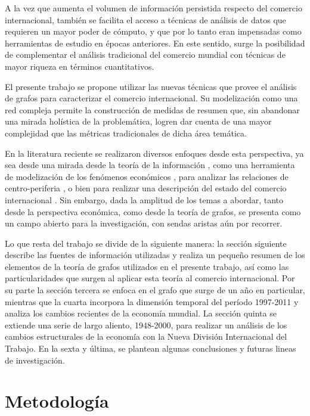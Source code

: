 \documentclass[a4paper]{article}
\begin{document}
A la vez que aumenta el volumen de información persistida respecto del comercio internacional, también se facilita el acceso a técnicas de análisis de datos que requieren un mayor poder de cómputo, y que por lo tanto eran impensadas como herramientas de estudio en épocas anteriores. En este sentido, surge la posibilidad de complementar el análisis tradicional del comercio mundial con técnicas de mayor riqueza en términos cuantitativos. 

El presente trabajo se propone utilizar las nuevas técnicas que provee el análisis de grafos para caracterizar el comercio internacional. Su modelización como una red compleja permite la construcción de medidas de resumen que, sin abandonar una mirada holística de la problemática, logren dar cuenta de una mayor complejidad que las métricas tradicionales de dicha área temática. 

En la literatura reciente se realizaron diversos enfoques desde esta perspectiva, ya sea desde una mirada desde la teoría de la información \cite{Bhattacharya2008},  como una herramienta de modelización de los fenómenos económicos \cite{Fan2014}, para analizar las relaciones de centro-periferia \cite{Fagiolo2010}, o bien para realizar una descripción del estado del comercio internacional \cite{Chow2013}. Sin embargo, dada la amplitud de los temas a abordar, tanto desde la perspectiva económica, como desde la teoría de grafos, se presenta como un campo abierto para la investigación, con sendas aristas aún por recorrer.        

Lo que resta del trabajo se divide de la siguiente manera: la sección siguiente describe las fuentes de información utilizadas y realiza un pequeño resumen de los elementos de la teoría de grafos utilizados en el presente trabajo, así como las particularidades que surgen al aplicar esta teoría al comercio internacional. Por su parte la sección tercera se enfoca en el grafo que surge de un año en particular, mientras que la cuarta incorpora la dimensión temporal del período 1997-2011 y analiza los cambios recientes de la economía mundial. La sección quinta se extiende una serie de largo aliento, 1948-2000, para realizar un análisis de los cambios estructurales de la economía con la Nueva División Internacional del Trabajo.
En la sexta y última, se plantean algunas conclusiones y futuras lineas de investigación.

\section{Metodología}
\end{document}

